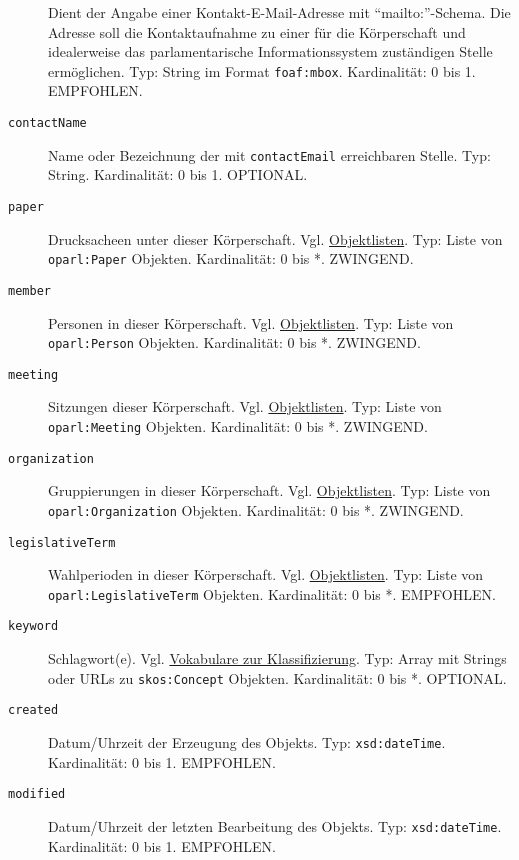 \documentclass[,a4paper]{article}
\begin{document}
\begin{description}
Dient der Angabe einer Kontakt-E-Mail-Adresse mit ``mailto:''-Schema.
Die Adresse soll die Kontaktaufnahme zu einer für die Körperschaft und
idealerweise das parlamentarische Informationssystem zuständigen Stelle
ermöglichen. Typ: String im Format \texttt{foaf:mbox}. Kardinalität: 0
bis 1. EMPFOHLEN.
\item[\texttt{contactName}]
Name oder Bezeichnung der mit \texttt{contactEmail} erreichbaren Stelle.
Typ: String. Kardinalität: 0 bis 1. OPTIONAL.
\item[\texttt{paper}]
Drucksacheen unter dieser Körperschaft. Vgl.
\hyperref[objektlisten]{Objektlisten}. Typ: Liste von
\texttt{oparl:Paper} Objekten. Kardinalität: 0 bis *. ZWINGEND.
\item[\texttt{member}]
Personen in dieser Körperschaft. Vgl.
\hyperref[objektlisten]{Objektlisten}. Typ: Liste von
\texttt{oparl:Person} Objekten. Kardinalität: 0 bis *. ZWINGEND.
\item[\texttt{meeting}]
Sitzungen dieser Körperschaft. Vgl.
\hyperref[objektlisten]{Objektlisten}. Typ: Liste von
\texttt{oparl:Meeting} Objekten. Kardinalität: 0 bis *. ZWINGEND.
\item[\texttt{organization}]
Gruppierungen in dieser Körperschaft. Vgl.
\hyperref[objektlisten]{Objektlisten}. Typ: Liste von
\texttt{oparl:Organization} Objekten. Kardinalität: 0 bis *. ZWINGEND.
\item[\texttt{legislativeTerm}]
Wahlperioden in dieser Körperschaft. Vgl.
\hyperref[objektlisten]{Objektlisten}. Typ: Liste von
\texttt{oparl:LegislativeTerm} Objekten. Kardinalität: 0 bis *.
EMPFOHLEN.
\item[\texttt{keyword}]
Schlagwort(e). Vgl. \hyperref[vokabulareux5fklassifizierung]{Vokabulare
zur Klassifizierung}. Typ: Array mit Strings oder URLs zu
\texttt{skos:Concept} Objekten. Kardinalität: 0 bis *. OPTIONAL.
\item[\texttt{created}]
Datum/Uhrzeit der Erzeugung des Objekts. Typ: \texttt{xsd:dateTime}.
Kardinalität: 0 bis 1. EMPFOHLEN.
\item[\texttt{modified}]
Datum/Uhrzeit der letzten Bearbeitung des Objekts. Typ:
\texttt{xsd:dateTime}. Kardinalität: 0 bis 1. EMPFOHLEN.
\end{description}

\end{document}
